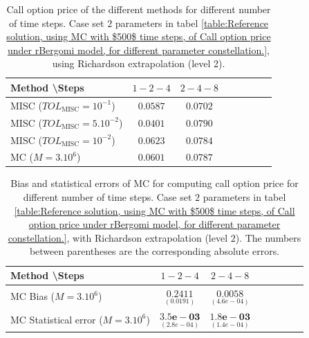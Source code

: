 		\begin{table}[h!]
		\centering
		\begin{tabular}{l*{6}{c}r}
		Method \textbackslash  Steps           &$1-2-4$ & $2-4-8$ \\
		\hline
		
		MISC ($TOL_{\text{MISC}}=10^{-1}$)  &$0.0587$  &$ 0.0702$   \\
		MISC ($TOL_{\text{MISC}}=5.10^{-2}$)  & $0.0401$ & $0.0790$  \\
		MISC ($TOL_{\text{MISC}}=10^{-2}$)  & $0.0623$ &  $0.0784$   \\
		
		\hline
		MC ($M=3.10^6$)  & $ 0.0601$ & $ 0.0787$   \\
		\hline 
	\end{tabular}
	\caption{ Call option price of the different methods for different number of time steps. Case set $2$ parameters in tabel \ref{table:Reference solution, using MC with $500$ time steps, of Call option price under rBergomi model, for different parameter constellation.}, using Richardson extrapolation (level 2).}
	\label{table: Call option price of the different methods for different number of time steps. Case $K=1,H=0.07$, using Richardson extrapolation_level2,linear}
\end{table}




\begin{table}[h!]
	\centering
	\begin{tabular}{l*{6}{c}r}
		Method \textbackslash  Steps            & $1-2-4$ & $2-4-8$  \\
		\hline
		MC  Bias  ($M=3.10^6$)   &$\underset{(  0.0191)}{\mathbf{  0.2411}}$  & $\underset{(      4.6e-04)}{\mathbf{  0.0058}}$   \\	
		
		MC Statistical error ($M=3.10^6$)   & $\underset{( 2.8e-04)}{\mathbf{3.5e-03}}$  & $\underset{(   1.4e-04)}{\mathbf{    1.8e-03}}$  \\	
		
		
		
		\hline
	\end{tabular}
	\caption{Bias and statistical errors of MC   for computing call option price  for different number of time steps. Case set $2$ parameters in tabel \ref{table:Reference solution, using MC with $500$ time steps, of Call option price under rBergomi model, for different parameter constellation.}, with Richardson extrapolation (level $2$). The numbers between parentheses are the corresponding absolute errors.}
	\label{Bias and Statistical errors of MC ($M=3.10^6$)  for computing Call option price  for different number of time steps. Case set $2$ parameters, with Richardson extrapolation (level2). The numbers between parentheses are the corresponding absolute errors.}
\end{table}






